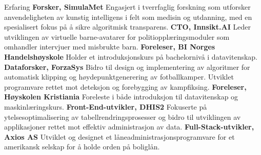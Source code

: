 \begin{rubric}{Erfaring}
%
\entry*[2022 -- nå]%
\textbf{Forsker, SimulaMet} Engasjert i tverrfaglig forskning som utforsker anvendeligheten av kunstig intelligens i felt som medisin og utdanning, med en spesialisert fokus på å sikre algoritmisk transparens.
%
\entry*[2023 -- nå]%
\textbf{CTO, Innsikt.AI} Leder utviklingen av virtuelle barne-avatarer for politiopplæringsmoduler som omhandler intervjuer med misbrukte barn.
%
\entry*[2023 -- nå]%
\textbf{Foreleser, BI Norges Handelshøyskole} Holder et introduksjonskurs på bachelornivå i datavitenskap.
%
\entry*[2022 -- nå]%
\textbf{Dataforsker, ForzaSys} Bidro til design og implementering av algoritmer for automatisk klipping og høydepunktgenerering av fotballkamper. Utviklet programvare rettet mot deteksjon og forebygging av kampfiksing.
%
\entry*[2019 -- 2020]%
\textbf{Foreleser, Høyskolen Kristiania} Foreleste i både introduksjon til datavitenskap og maskinlæringskurs.
%
\entry*[2017 -- 2018]%
\textbf{Front-End-utvikler, DHIS2} Fokuserte på ytelsesoptimalisering av tabellrendringsprosesser og bidro til utviklingen av applikasjoner rettet mot effektiv administrasjon av data.
%
\entry*[2014 -- 2016]%
\textbf{Full-Stack-utvikler, Axios AS} Utviklet og designet et låneadministrasjonsprogramvare for et amerikansk selskap for å holde orden på boliglån.
%
\end{rubric}